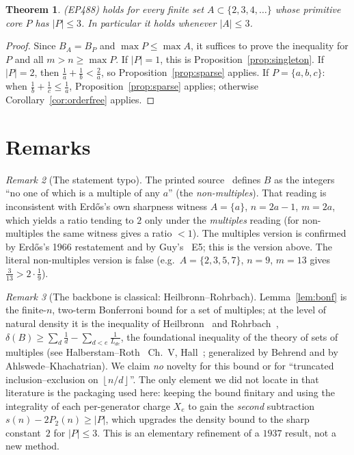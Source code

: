 \documentclass[11pt]{article}
\newtheorem{theorem}{Theorem}
\theoremstyle{remark}
\newtheorem{remark}[theorem]{Remark}
\newcommand{\floor}[1]{\left\lfloor #1 \right\rfloor}
\newcommand{\dens}{\delta}          %
\begin{document}
\begin{theorem}\label{thm:main}
(EP488) holds for every finite set $A\subset\{2,3,4,\dots\}$ whose primitive core
$P$ has $|P|\le 3$. In particular it holds whenever $|A|\le 3$.
\end{theorem}
\begin{proof}
Since $B_A=B_P$ and $\max P\le\max A$, it suffices to prove the inequality for
$P$ and all $m>n\ge\max P$.
If $|P|=1$, this is Proposition~\ref{prop:singleton}.
If $|P|=2$, then $\tfrac1a+\tfrac1b<\tfrac2a$, so Proposition~\ref{prop:sparse}
applies.
If $P=\{a,b,c\}$: when $\tfrac1b+\tfrac1c\le\tfrac1a$,
Proposition~\ref{prop:sparse} applies; otherwise Corollary~\ref{cor:orderfree}
applies.
\end{proof}

\section{Remarks}\label{sec:remarks}

\begin{remark}[The statement typo]\label{rem:typo}
The printed source~\cite{Erdos61} defines $B$ as the integers ``no one of which is
a multiple of any $a$'' (the \emph{non-multiples}). That reading is inconsistent
with Erd\H{o}s's own sharpness witness $A=\{a\}$, $n=2a-1$, $m=2a$, which yields a
ratio tending to $2$ only under the \emph{multiples} reading (for non-multiples
the same witness gives a ratio $<1$). The multiples version is confirmed by
Erd\H{o}s's 1966 restatement and by Guy's~\cite{Guy} E5; this is the version above.
The literal non-multiples version is false (e.g.\ $A=\{2,3,5,7\}$, $n=9$, $m=13$
gives $\tfrac3{13}>2\cdot\tfrac19$).
\end{remark}

\begin{remark}[The backbone is classical: Heilbronn--Rohrbach]\label{rem:HR}
Lemma~\ref{lem:bonf} is the finite-$n$, two-term Bonferroni bound for a set of
multiples; at the level of natural density it is the inequality of
Heilbronn~\cite{Heilbronn37} and Rohrbach~\cite{Rohrbach37},
$\dens(B)\ge\sum_d\frac1d-\sum_{d<e}\frac1{L_{de}}$, the foundational inequality of
the theory of sets of multiples (see Halberstam--Roth~\cite{HalberstamRoth} Ch.~V,
Hall~\cite{Hall}; generalized by Behrend and by Ahlswede--Khachatrian). We claim
\emph{no} novelty for this bound or for ``truncated inclusion--exclusion on
$\floor{n/d}$''. The only element we did not locate in that literature is the
packaging used here: keeping the bound finitary and using the integrality of each
per-generator charge $X_e$ to gain the \emph{second} subtraction
$s(n)-2P_2(n)\ge|P|$, which upgrades the density bound to the sharp constant~$2$
for $|P|\le 3$. This is an elementary refinement of a $1937$ result, not a new
method.
\end{remark}
\end{document}
